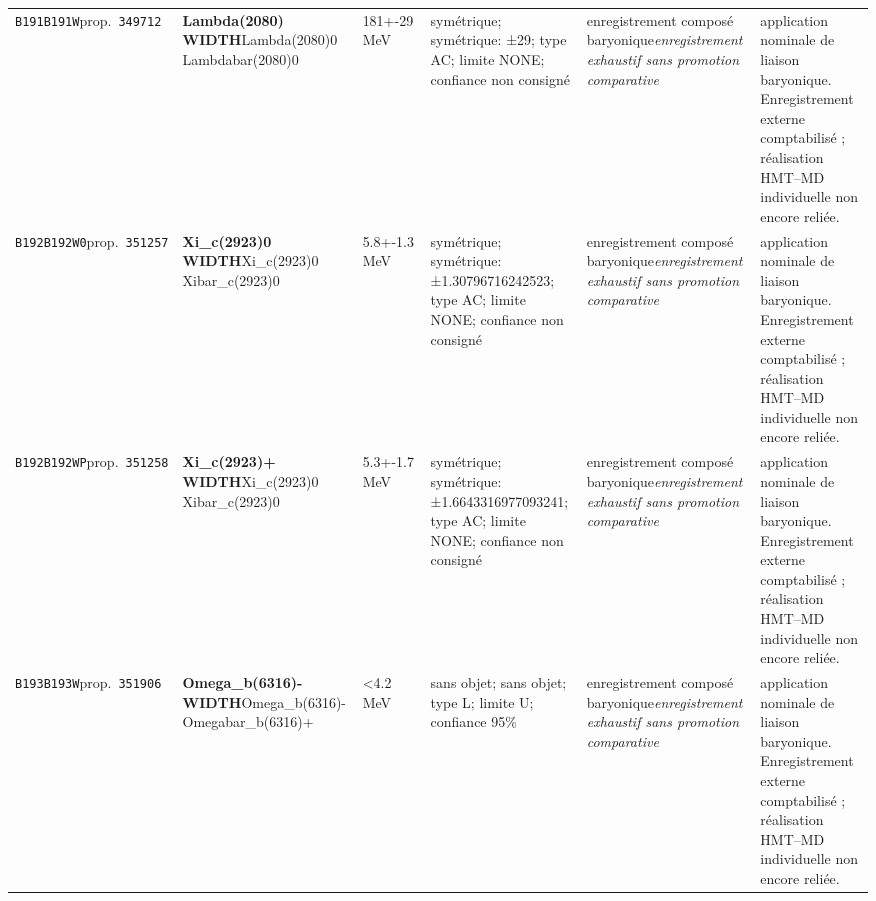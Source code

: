 \begin{landscape}
\begin{longtable}{L{1.85cm}L{4.45cm}L{2.35cm}L{4.05cm}L{3.35cm}L{7.15cm}}
\texttt{B191}\newline \texttt{B191W}\newline prop.\ \texttt{349712} & \textbf{Lambda(2080) WIDTH}\newline Lambda(2080)0 \textbar{}\allowbreak{} Lambdabar(2080)0 & 181+-29\,MeV & symétrique; symétrique: ±29; type AC; limite NONE; confiance non consigné & enregistrement composé baryonique\newline \emph{enregistrement exhaustif sans promotion comparative} & application nominale de liaison baryonique. Enregistrement externe comptabilisé ; réalisation HMT--MD individuelle non encore reliée. \\
\texttt{B192}\newline \texttt{B192W0}\newline prop.\ \texttt{351257} & \textbf{Xi\_\allowbreak{}c(2923)0 WIDTH}\newline Xi\_\allowbreak{}c(2923)0 \textbar{}\allowbreak{} Xibar\_\allowbreak{}c(2923)0 & 5.8+-1.3\,MeV & symétrique; symétrique: ±1.30796716242523; type AC; limite NONE; confiance non consigné & enregistrement composé baryonique\newline \emph{enregistrement exhaustif sans promotion comparative} & application nominale de liaison baryonique. Enregistrement externe comptabilisé ; réalisation HMT--MD individuelle non encore reliée. \\
\texttt{B192}\newline \texttt{B192WP}\newline prop.\ \texttt{351258} & \textbf{Xi\_\allowbreak{}c(2923)+ WIDTH}\newline Xi\_\allowbreak{}c(2923)0 \textbar{}\allowbreak{} Xibar\_\allowbreak{}c(2923)0 & 5.3+-1.7\,MeV & symétrique; symétrique: ±1.6643316977093241; type AC; limite NONE; confiance non consigné & enregistrement composé baryonique\newline \emph{enregistrement exhaustif sans promotion comparative} & application nominale de liaison baryonique. Enregistrement externe comptabilisé ; réalisation HMT--MD individuelle non encore reliée. \\
\texttt{B193}\newline \texttt{B193W}\newline prop.\ \texttt{351906} & \textbf{Omega\_\allowbreak{}b(6316)- WIDTH}\newline Omega\_\allowbreak{}b(6316)- \textbar{}\allowbreak{} Omegabar\_\allowbreak{}b(6316)+ & \textless{}4.2\,MeV & sans objet; sans objet; type L; limite U; confiance 95\% & enregistrement composé baryonique\newline \emph{enregistrement exhaustif sans promotion comparative} & application nominale de liaison baryonique. Enregistrement externe comptabilisé ; réalisation HMT--MD individuelle non encore reliée. \\

\end{longtable}
\end{landscape}
